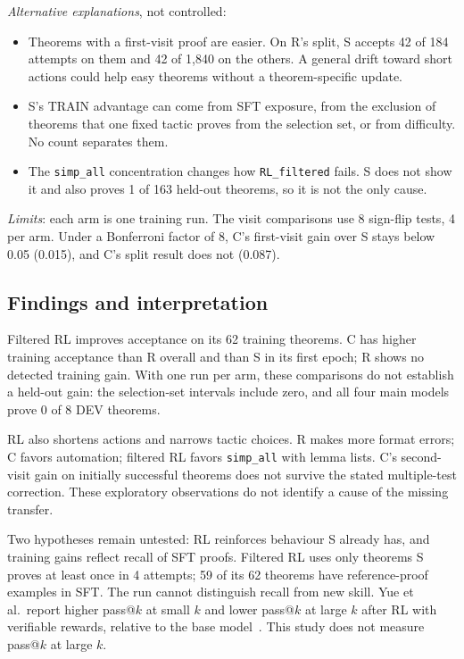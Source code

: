 \documentclass[11pt]{article}
\newcommand{\code}[1]{\texttt{#1}}
\begin{document}
\emph{Alternative explanations}, not controlled:
\begin{itemize}
\item Theorems with a first-visit proof are easier. On R's split, S accepts 42 of 184 attempts on them and 42 of 1,840 on the others. A general drift toward short actions could help easy theorems without a theorem-specific update.
\item S's TRAIN advantage can come from SFT exposure, from the exclusion of theorems that one fixed tactic proves from the selection set, or from difficulty. No count separates them.
\item The \code{simp\_all} concentration changes how \code{RL\_filtered} fails. S does not show it and also proves 1 of 163 held-out theorems, so it is not the only cause.
\end{itemize}

\emph{Limits}: each arm is one training run.
The visit comparisons use 8 sign-flip tests, 4 per arm.
Under a Bonferroni factor of 8, C's first-visit gain over S stays below 0.05 (0.015), and C's split result does not (0.087).

\subsection{Findings and interpretation}
\label{sec:oct19-summary}

Filtered RL improves acceptance on its 62 training theorems. C has higher training acceptance than R overall and than S in its first epoch; R shows no detected training gain.
With one run per arm, these comparisons do not establish a held-out gain: the selection-set intervals include zero, and all four main models prove 0 of 8 DEV theorems.

RL also shortens actions and narrows tactic choices. R makes more format errors; C favors automation; filtered RL favors \code{simp\_all} with lemma lists.
C's second-visit gain on initially successful theorems does not survive the stated multiple-test correction.
These exploratory observations do not identify a cause of the missing transfer.

Two hypotheses remain untested: RL reinforces behaviour S already has, and training gains reflect recall of SFT proofs.
Filtered RL uses only theorems S proves at least once in 4 attempts; 59 of its 62 theorems have reference-proof examples in SFT.
The run cannot distinguish recall from new skill.
Yue et al.\ report higher pass@$k$ at small $k$ and lower pass@$k$ at large $k$ after RL with verifiable rewards, relative to the base model~\cite{yue2025}.
This study does not measure pass@$k$ at large $k$.
\end{document}
